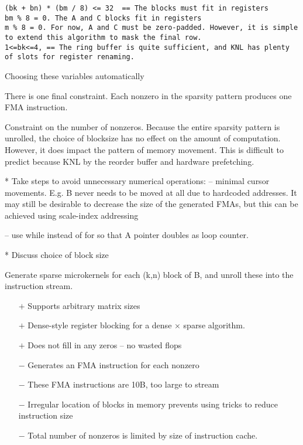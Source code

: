 \begin{verbatim}
(bk + bn) * (bm / 8) <= 32  == The blocks must fit in registers
bm % 8 = 0. The A and C blocks fit in registers
m % 8 = 0. For now, A and C must be zero-padded. However, it is simple to extend this algorithm to mask the final row.
1<=bk<=4, == The ring buffer is quite sufficient, and KNL has plenty of slots for register renaming.
\end{verbatim}

Choosing these variables automatically 

There is one final constraint. Each nonzero in the sparsity pattern produces one FMA instruction. 

Constraint on the number of nonzeros. Because the entire sparsity pattern is unrolled, the choice of blocksize has no effect on the amount of computation. However, it does impact the pattern of memory movement. This is difficult to predict because KNL  by the reorder buffer and hardware prefetching.


* Take steps to avoid unnecessary numerical operations: 
-- minimal cursor movements. E.g. B never needs to be moved at all due to hardcoded addresses. It may still be desirable to decrease the size of the generated FMAs, but this can be achieved using scale-index addressing 

-- use while instead of for so that A pointer doubles as loop counter.


* Discuss choice of block size


Generate sparse microkernels for each (k,n) block of B, and unroll these into the instruction stream.
\begin{itemize}
      \item[$+$] Supports arbitrary matrix sizes
      \item[$+$] Dense-style register blocking for a dense $\times$ sparse algorithm.
      \item[$+$] Does not fill in any zeros -- no wasted flops

      \item[$-$] Generates an FMA instruction for each nonzero
      \item[$-$] These FMA instructions are 10B, too large to stream
      \item[$-$] Irregular location of blocks in memory prevents using tricks to reduce instruction size
      \item[$-$] Total number of nonzeros is limited by size of instruction cache.

\end{itemize}

